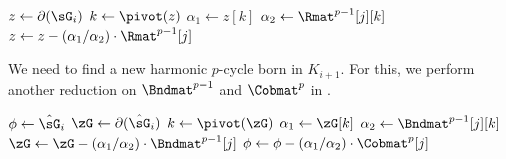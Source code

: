 \begin{algorithm}[h]
\caption{Reduction based on $\Rmat^{p-1}$ for determining whether $\fsimp_i$ is positive or negative}

\begin{algorithmic}[1]
\State $z\leftarrow\partial({\sG}_i)$
\State $k\leftarrow\pivot(z)$
\State $\alpha_1\leftarrow z[k]$
\State $\alpha_2\leftarrow\Rmat^{p-1}[j][k]$
\State $z\leftarrow z-(\alpha_1/\alpha_2)\cdot\Rmat^{p-1}[j]$
\EndWhile
\end{algorithmic}
\label{algr:usual-reduce}
\end{algorithm}



We need to find a new harmonic $p$-cycle born in $K_{i+1}$.
For this, we perform another reduction on $\Bndmat^{p-1}$ and $\Cobmat^{p}$
 in .

\begin{algorithm}[!h]
\caption{Reduction based on $\Bndmat^{p-1},\Cobmat^p$ for finding a new-born harmonic cycle 
}

\begin{algorithmic}[1]
\State $\phi\leftarrow\hat{\sG}_i$
\State $\zG\leftarrow\partial(\hat{\sG}_i)$
\State $k\leftarrow\pivot(\zG)$
\State $\alpha_1\leftarrow\zG[k]$
\State $\alpha_2\leftarrow\Bndmat^{p-1}[j][k]$
\State $\zG\leftarrow \zG-(\alpha_1/\alpha_2)\cdot\Bndmat^{p-1}[j]$
\State $\phi\leftarrow \phi-(\alpha_1/\alpha_2)\cdot\Cobmat^{p}[j]$
\EndWhile
\end{algorithmic}
\label{algr:reduce}
\end{algorithm}

